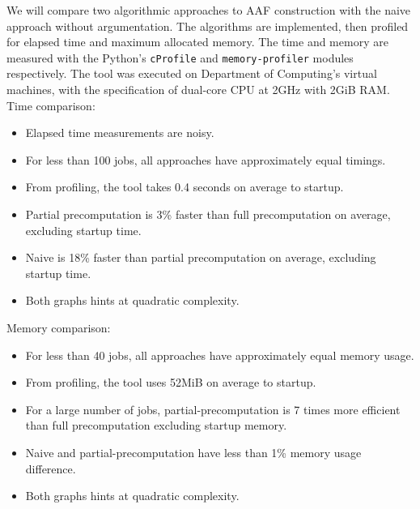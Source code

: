 We will compare two algorithmic approaches to AAF construction with the naive approach without argumentation. The algorithms are implemented, then profiled for elapsed time and maximum allocated memory. The time and memory are measured with the Python's \texttt{cProfile} and \texttt{memory-profiler} modules respectively. The tool was executed on Department of Computing's virtual machines, with the specification of dual-core CPU at 2GHz with 2GiB RAM.
\linespace
Time comparison:
\begin{itemize}
	\item Elapsed time measurements are noisy.
	\item For less than 100 jobs, all approaches have approximately equal timings.
	\item From profiling, the tool takes 0.4 seconds on average to startup.
	\item Partial precomputation is 3\% faster than full precomputation on average, excluding startup time.
	\item Naive is 18\% faster than partial precomputation on average, excluding startup time.
	\item Both graphs hints at quadratic complexity.
\end{itemize}

Memory comparison:
\begin{itemize}
	\item For less than 40 jobs, all approaches have approximately equal memory usage.
	\item From profiling, the tool uses 52MiB on average to startup.
	\item For a large number of jobs, partial-precomputation is 7 times more efficient than full precomputation excluding startup memory.
	\item Naive and partial-precomputation have less than 1\% memory usage difference.
	\item Both graphs hints at quadratic complexity.
\end{itemize}

\newpage

